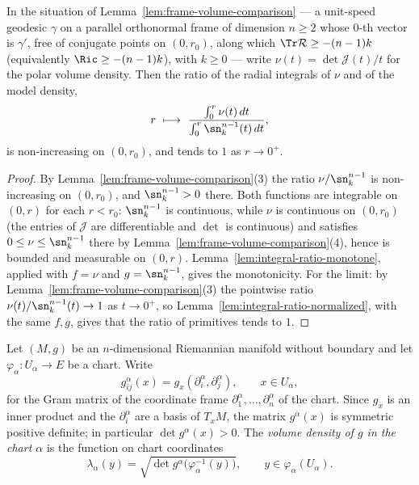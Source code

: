 \begin{lemma}
\label{lem:frame-bishop-gromov}
\leanok
In the situation of Lemma~\ref{lem:frame-volume-comparison} --- a unit-speed
geodesic $\gamma$ on a parallel orthonormal frame of dimension $n\ge2$ whose
$0$-th vector is $\gamma'$, free of conjugate points on $(0,r_0)$, along which
$\Tr\mathcal R\ge-(n-1)k$ (equivalently $\Ric\ge-(n-1)k$), with $k\ge0$ ---
write $\nu(t)=\det\mathcal J(t)/t$ for the polar volume density. Then the ratio
of the radial integrals of $\nu$ and of the model density,
$$r\ \longmapsto\ \frac{\int_0^r\nu(t)\,dt}{\int_0^r\sn_k^{n-1}(t)\,dt},$$
is non-increasing on $(0,r_0)$, and tends to $1$ as $r\to0^+$.
\end{lemma}

\begin{proof}
\leanok
By Lemma~\ref{lem:frame-volume-comparison}(3) the ratio $\nu/\sn_k^{n-1}$ is
non-increasing on $(0,r_0)$, and $\sn_k^{n-1}>0$ there. Both functions are
integrable on $(0,r)$ for each $r<r_0$: $\sn_k^{n-1}$ is continuous, while $\nu$
is continuous on $(0,r_0)$ (the entries of $\mathcal J$ are differentiable and
$\det$ is continuous) and satisfies $0\le\nu\le\sn_k^{n-1}$ there by
Lemma~\ref{lem:frame-volume-comparison}(4), hence is bounded and measurable on
$(0,r)$. Lemma~\ref{lem:integral-ratio-monotone}, applied with $f=\nu$ and
$g=\sn_k^{n-1}$, gives the monotonicity. For the limit: by
Lemma~\ref{lem:frame-volume-comparison}(3) the pointwise ratio
$\nu(t)/\sn_k^{n-1}(t)\to1$ as $t\to0^+$, so
Lemma~\ref{lem:integral-ratio-normalized}, with the same $f,g$, gives that the
ratio of primitives tends to $1$.
\end{proof}

\begin{definition}
\label{def:chart-volume-density}
\leanok
Let $(M,g)$ be an $n$-dimensional Riemannian manifold without boundary and let
$\varphi_\alpha\colon U_\alpha\to E$ be a chart. Write
$$g^\alpha_{ij}(x)=g_x(\partial^\alpha_i,\partial^\alpha_j),\qquad x\in U_\alpha,$$
for the Gram matrix of the coordinate frame $\partial^\alpha_1,\dots,\partial^\alpha_n$
of the chart. Since $g_x$ is an inner product and the $\partial^\alpha_i$ are a basis of
$T_xM$, the matrix $g^\alpha(x)$ is symmetric positive definite; in particular
$\det g^\alpha(x)>0$. The \emph{volume density of $g$ in the chart $\alpha$} is the
function on chart coordinates
$$\lambda_\alpha(y)=\sqrt{\det g^\alpha\bigl(\varphi_\alpha^{-1}(y)\bigr)},
\qquad y\in\varphi_\alpha(U_\alpha).$$
\end{definition}

